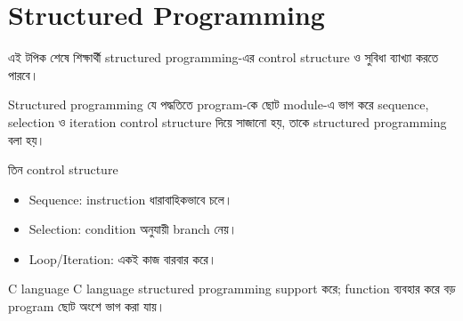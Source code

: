 \section{Structured Programming}

\begin{learningbox}
এই টপিক শেষে শিক্ষার্থী structured programming-এর control structure ও সুবিধা ব্যাখ্যা করতে পারবে।
\end{learningbox}

\begin{definitionbox}{Structured programming}
যে পদ্ধতিতে program-কে ছোট module-এ ভাগ করে sequence, selection ও iteration control structure দিয়ে সাজানো হয়, তাকে structured programming বলা হয়।
\end{definitionbox}

\begin{keypointbox}{তিন control structure}
\begin{itemize}
\item Sequence: instruction ধারাবাহিকভাবে চলে।
\item Selection: condition অনুযায়ী branch নেয়।
\item Loop/Iteration: একই কাজ বারবার করে।
\end{itemize}
\end{keypointbox}

\begin{examplebox}{C language}
C language structured programming support করে; function ব্যবহার করে বড় program ছোট অংশে ভাগ করা যায়।
\end{examplebox}
